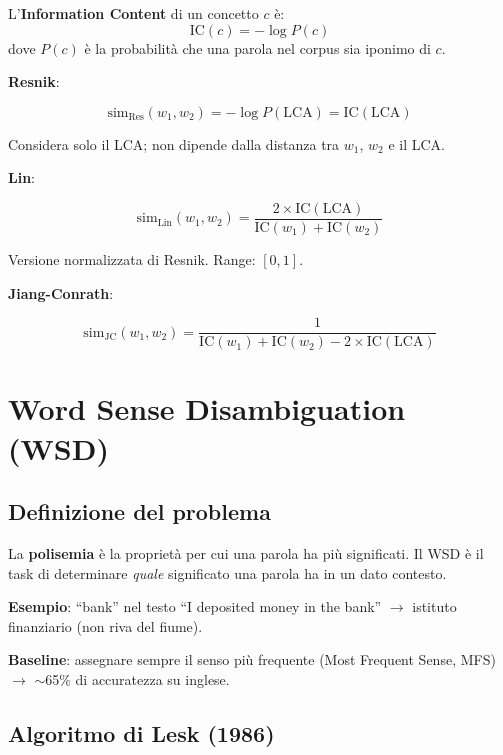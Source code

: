 \documentclass[12pt,a4paper]{article}
\begin{document}
L'\textbf{Information Content} di un concetto $c$ è:
\[
\text{IC}(c) = -\log P(c)
\]
dove $P(c)$ è la probabilità che una parola nel corpus sia iponimo di $c$.

\textbf{Resnik}:
\begin{formulabox}
\[
\text{sim}_{\text{Res}}(w_1, w_2) = -\log P(\text{LCA}) = \text{IC}(\text{LCA})
\]
\end{formulabox}
Considera solo il LCA; non dipende dalla distanza tra $w_1$, $w_2$ e il LCA.

\textbf{Lin}:
\begin{formulabox}
\[
\text{sim}_{\text{Lin}}(w_1, w_2) = \frac{2 \times \text{IC}(\text{LCA})}{\text{IC}(w_1) + \text{IC}(w_2)}
\]
\end{formulabox}
Versione normalizzata di Resnik. Range: $[0,1]$.

\textbf{Jiang-Conrath}:
\begin{formulabox}
\[
\text{sim}_{\text{JC}}(w_1, w_2) = \frac{1}{\text{IC}(w_1) + \text{IC}(w_2) - 2 \times \text{IC}(\text{LCA})}
\]
\end{formulabox}

\section{Word Sense Disambiguation (WSD)}

\subsection{Definizione del problema}

La \textbf{polisemia} è la proprietà per cui una parola ha più significati. Il WSD è il task di determinare \emph{quale} significato una parola ha in un dato contesto.

\begin{defbox}
\textbf{Esempio}: ``bank'' nel testo ``I deposited money in the bank'' $\to$ istituto finanziario (non riva del fiume).
\end{defbox}

\textbf{Baseline}: assegnare sempre il senso più frequente (Most Frequent Sense, MFS) $\to$ $\sim$65\% di accuratezza su inglese.

\subsection{Algoritmo di Lesk (1986)}
\end{document}
